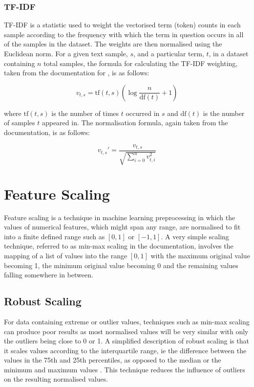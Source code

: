 \subsubsection{TF-IDF}

TF-IDF is a statistic used to weight the vectorised term (token) counts in each sample according to the frequency with which the term in question occurs in all of the samples in the dataset. The weights are then normalised using the Euclidean norm. For a given text sample, $s$, and a particular term, $t$, in a dataset containing $n$ total samples, the formula for calculating the TF-IDF weighting, taken from the documentation for \cite{pedregosa2011scikit}, is as follows:

\begin{equation*}
    v_{t,s} = \mathrm{tf}(t, s) \left( \log{\frac{n}{\mathrm{df}(t)}} + 1 \right)
\end{equation*}

where $\mathrm{tf}(t, s)$ is the number of times $t$ occurred in $s$ and $\mathrm{df}(t)$ is the number of samples $t$ appeared in. The normalisation formula, again taken from the documentation, is as follows:

\begin{equation*}
    v_{t,s}' = \frac{v_{t,s}}{\sqrt{\sum_{i=0}^n v_{t,i}^2}}
\end{equation*}

\section{Feature Scaling} \label{sec:TBG_FS}

Feature scaling is a technique in machine learning preprocessing in which the values of numerical features, which might span any range, are normalised to fit into a finite defined range such as $[0,1]$ or $[-1,1]$. A very simple scaling technique, referred to as min-max scaling in the \cite{pedregosa2011scikit} documentation, involves the mapping of a list of values into the range $[0,1]$ with the maximum original value becoming 1, the minimum original value becoming 0 and the remaining values falling somewhere in between.

\subsection{Robust Scaling} \label{sec:TBG_FS_Robust}

For data containing extreme or outlier values, techniques such as min-max scaling can produce poor results as most normalised values will be very similar with only the outliers being close to 0 or 1. A simplified description of robust scaling is that it scales values according to the interquartile range, ie the difference between the values in the 75th and 25th percentiles, as opposed to the median or the minimum and maximum values \cite{pedregosa2011scikit}. This technique reduces the influence of outliers on the resulting normalised values.

